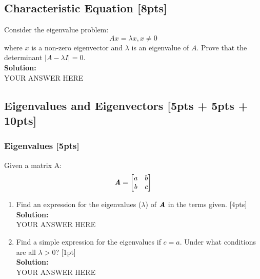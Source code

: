\documentclass{article}
\begin{document}
\subsection{Characteristic Equation [8pts]}
Consider the eigenvalue problem: 
$$Ax =\lambda x, x \neq 0$$
where $x$ is a non-zero eigenvector and $\lambda$ is an eigenvalue of $A$. Prove that the determinant $|A-\lambda I|= 0$.\bigskip \\
\textbf{Solution:}\\
YOUR ANSWER HERE
\newpage

\subsection{Eigenvalues and Eigenvectors [5pts + 5pts + 10pts]}
\subsubsection{Eigenvalues [5pts]}
Given a matrix A:
$$\textbf{\textit{A}}=\begin{bmatrix}
    a & b \\
    b & c
    \end{bmatrix}$$
\begin{enumerate}[label=(\alph*)]
\item Find an expression for the eigenvalues ($\lambda$) of $\textbf{\textit{A}}$ in the terms given. [4pts]\bigskip \\
\textbf{Solution:}\\
YOUR ANSWER HERE
\newpage
\item Find a simple expression for the eigenvalues if $c= a$. Under what conditions are all $\lambda>0$? [1pt]\bigskip \\
\textbf{Solution:}\\
YOUR ANSWER HERE
\newpage
\end{enumerate}
    
\end{document}
